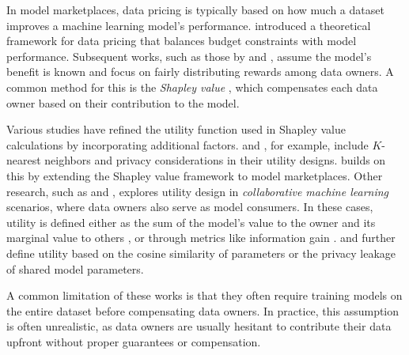 In model marketplaces, data pricing is typically based on how much a dataset improves a machine learning model's performance. \cite{abernethy2015low} introduced a theoretical framework for data pricing that balances budget constraints with model performance. Subsequent works, such as those by \cite{agarwal2019marketplace} and \cite{ghorbani2019data}, assume the model's benefit is known and focus on fairly distributing rewards among data owners. A common method for this is the \emph{Shapley value} \cite{shapley1951notes}, which compensates each data owner based on their contribution to the model.

Various studies have refined the utility function used in Shapley value calculations by incorporating additional factors. \cite{ghorbani2019data} and \cite{jia2019efficient}, for example, include $K$-nearest neighbors and privacy considerations in their utility designs. \cite{liu2020dealer} builds on this by extending the Shapley value framework to model marketplaces. Other research, such as \cite{sim2020collaborative} and \cite{ohrimenko2019collaborative}, explores utility design in \emph{collaborative machine learning} scenarios, where data owners also serve as model consumers. In these cases, utility is defined either as the sum of the model's value to the owner and its marginal value to others \cite{ohrimenko2019collaborative}, or through metrics like information gain \cite{sim2020collaborative}. \cite{xu2021gradient} and \cite{hu2020trading} further define utility based on the cosine similarity of parameters or the privacy leakage of shared model parameters.

A common limitation of these works is that they often require training models on the entire dataset before compensating data owners. In practice, this assumption is often unrealistic, as data owners are usually hesitant to contribute their data upfront without proper guarantees or compensation.

